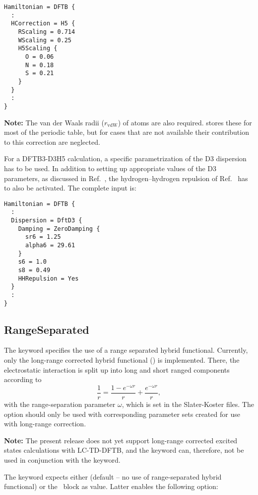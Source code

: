 \begin{verbatim}
Hamiltonian = DFTB {
  :
  HCorrection = H5 {
    RScaling = 0.714
    WScaling = 0.25
    H5Scaling {
      O = 0.06
      N = 0.18
      S = 0.21
    }
  }
  :
}
\end{verbatim}

\textbf{Note:} \label{page:dftbp.H5} The van der Waals radii ($r_\text{vdW}$) of
atoms are also required. \dftbp{} stores these for most of the periodic table,
but for cases that are not available their contribution to this correction are
neglected.

For a DFTB3-D3H5 calculation, a specific parametrization of the D3 dispersion
has to be used. In addition to setting up appropriate values of the D3
parameters, as discussed in Ref.~\cite{rezac-jctc-13-2017}, the
hydrogen--hydrogen repulsion of Ref.~\cite{rezac-jctc-8-2012} has to also be
activated. The complete input is:
\begin{verbatim}
Hamiltonian = DFTB {
  :
  Dispersion = DftD3 {
    Damping = ZeroDamping {
      sr6 = 1.25
      alpha6 = 29.61
    }
    s6 = 1.0
    s8 = 0.49
    HHRepulsion = Yes
  }
  :
}
\end{verbatim}

\subsection{RangeSeparated}
\label{sec:dftbp.RangeSep}

The  keyword specifies the use of a range separated hybrid
functional. Currently, only the long-range corrected hybrid functional ()
\cite{niehaus-PSSB-249-237,lutsker-JCP-143-184107} is implemented. There, the
electrostatic interaction is split up into long and short ranged components
according to
\begin{equation*}
\frac{1}{r}=\frac{1-e^{-\omega r}}{r}+\frac{e^{-\omega r}}{r},
\end{equation*}
with the range-separation parameter $\omega$, which is set in the Slater-Koster
files. The option should only be used with corresponding parameter sets created
for use with long-range correction.

\textbf{Note:} The present release does not yet support long-range
corrected excited states calculations with LC-TD-DFTB, and the
 keyword can, therefore, not be used in conjunction with the
 keyword.

The  keyword expects either  (default -- no use of
range-separated hybrid functional) or the \cb\  block as value. Latter
enables the following option:

